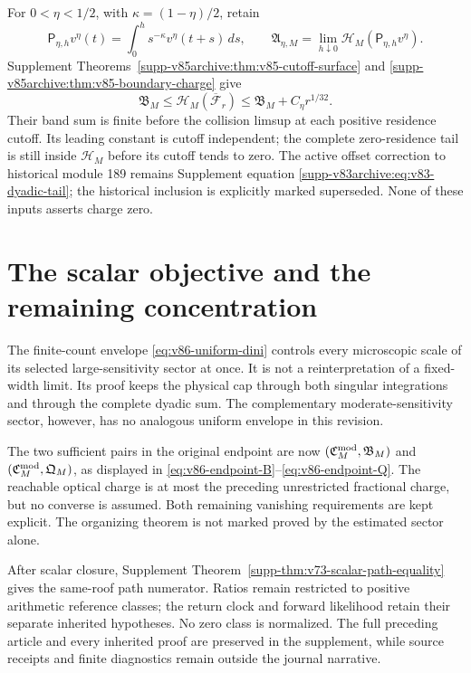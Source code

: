 \documentclass[11pt,reqno]{amsart}
\numberwithin{equation}{section}
\theoremstyle{definition}\newtheorem{definition}[theorem]{Definition}
\theoremstyle{remark}\newtheorem{remark}[theorem]{Remark}
\theoremstyle{definition}\newtheorem{inputstatement}[theorem]{Input statement}
\begin{document}
For $0<\eta<1/2$, with $\kappa=(1-\eta)/2$, retain
\[
 \mathsf P_{\eta,h}v^\eta(t)=\int_0^h s^{-\kappa}v^\eta(t+s)\,ds,
 \qquad\mathfrak A_{\eta,M}
       =\lim_{h\downarrow0}\mathcal H_M(\mathsf P_{\eta,h}v^\eta).
\]
Supplement Theorems~\ref{supp-v85archive:thm:v85-cutoff-surface}
and \ref{supp-v85archive:thm:v85-boundary-charge} give
\begin{equation}\label{eq:v86-surface-input}
 \mathfrak B_M\le\mathcal H_M(\overline{\mathcal F}_r)
                         \le\mathfrak B_M+C_\eta r^{1/32}.
\end{equation}
Their band sum is finite before the collision limsup at each positive
residence cutoff. Its leading constant is cutoff independent; the
complete zero-residence tail is still inside $\mathcal H_M$ before
its cutoff tends to zero. The active offset correction to historical
module 189 remains Supplement equation
\eqref{supp-v83archive:eq:v83-dyadic-tail}; the historical inclusion is
explicitly marked superseded. None of these inputs asserts charge zero.





\section{The scalar objective and the remaining concentration}
The finite-count envelope \eqref{eq:v86-uniform-dini} controls every
microscopic scale of its selected large-sensitivity sector at once.
It is not a reinterpretation of a fixed-width limit. Its proof keeps
the physical cap through both singular integrations and through the
complete dyadic sum. The complementary moderate-sensitivity sector,
however, has no analogous uniform envelope in this revision.

The two sufficient pairs in the original endpoint are now
$(\mathfrak C_M^{\rm mod},\mathfrak B_M)$ and
$(\mathfrak C_M^{\rm mod},\mathfrak Q_M)$, as displayed in
\eqref{eq:v86-endpoint-B}--\eqref{eq:v86-endpoint-Q}.
The reachable optical charge is at most the preceding unrestricted
fractional charge, but no converse is assumed. Both remaining
vanishing requirements are kept explicit. The organizing theorem
is not marked proved by the estimated sector alone.

After scalar closure, Supplement
Theorem~\ref{supp-thm:v73-scalar-path-equality} gives the same-roof
path numerator. Ratios remain restricted to positive arithmetic
reference classes; the return clock and forward likelihood retain
their separate inherited hypotheses. No zero class is normalized.
The full preceding article and every inherited proof are preserved
in the supplement, while source receipts and finite diagnostics remain
outside the journal narrative.
\end{document}
